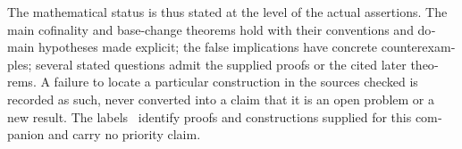 \begin{otherlanguage}{english}
The mathematical status is thus stated at the level of the actual assertions. The main cofinality and base-change theorems hold with their conventions and domain hypotheses made explicit; the false implications have concrete counterexamples; several stated questions admit the supplied proofs or the cited later theorems. A failure to locate a particular construction in the sources checked is recorded as such, never converted into a claim that it is an open problem or a new result. The labels \ours\ identify proofs and constructions supplied for this companion and carry no priority claim.
\end{otherlanguage}
